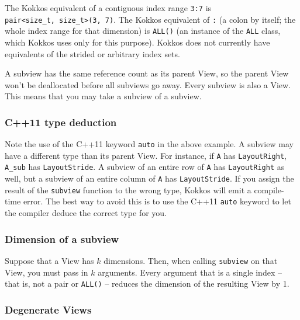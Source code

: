 The Kokkos equivalent of a contiguous index range \texttt{3:7} is \\
\lstinline!pair<size_t, size_t>(3, 7)!.  The Kokkos equivalent of
\texttt{:} (a colon by itself; the whole index range for that
dimension) is \texttt{ALL()} (an instance of the \texttt{ALL} class,
which Kokkos uses only for this purpose).  Kokkos does not currently
have equivalents of the strided or arbitrary index sets.

A subview has the same reference count as its parent View, so the
parent View won't be deallocated before all subviews go away.  Every
subview is also a View.  This means that you may take a subview of a
subview.

\subsubsection{C++11 type deduction}\label{SS:Subviews:How:auto}

Note the use of the C++11 keyword \texttt{auto} in the above example.
A subview may have a different type than its parent View.  For
instance, if \lstinline!A! has \lstinline!LayoutRight!,
\lstinline!A_sub!  has \lstinline!LayoutStride!.  A subview of an
entire row of \lstinline!A! has \lstinline!LayoutRight! as well, but a
subview of an entire column of \lstinline!A! has
\lstinline!LayoutStride!.  If you assign the result of the
\texttt{subview} function to the wrong type, Kokkos will emit a
compile-time error.  The best way to avoid this is to use the C++11
\texttt{auto} keyword to let the compiler deduce the correct type for
you.

\subsubsection{Dimension of a subview}\label{SS:Subviews:How:dim}

Suppose that a View has $k$ dimensions.  Then, when calling
\texttt{subview} on that View, you must pass in $k$ arguments.  Every
argument that is a single index -- that is, not a pair or
\lstinline!ALL()! -- reduces the dimension of the resulting View by 1.

\subsubsection{Degenerate Views}\label{SS:Subviews:How:degen}

